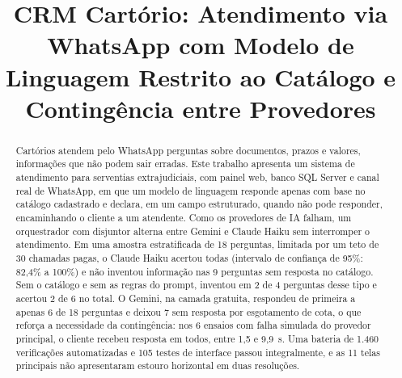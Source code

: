 \documentclass[conference]{IEEEtran}
\begin{document}
\title{CRM Cartório: Atendimento via WhatsApp com Modelo de Linguagem Restrito ao Catálogo e Contingência entre Provedores}

\author{
\and
{}
\and
{}
}

\maketitle

\begin{abstract}
Cartórios atendem pelo WhatsApp perguntas sobre documentos, prazos e valores, informações que não podem sair erradas. Este trabalho apresenta um sistema de atendimento para serventias extrajudiciais, com painel web, banco SQL Server e canal real de WhatsApp, em que um modelo de linguagem responde apenas com base no catálogo cadastrado e declara, em um campo estruturado, quando não pode responder, encaminhando o cliente a um atendente. Como os provedores de IA falham, um orquestrador com disjuntor alterna entre Gemini e Claude Haiku sem interromper o atendimento. Em uma amostra estratificada de 18 perguntas, limitada por um teto de 30 chamadas pagas, o Claude Haiku acertou todas (intervalo de confiança de 95\%: 82,4\% a 100\%) e não inventou informação nas 9 perguntas sem resposta no catálogo. Sem o catálogo e sem as regras do prompt, inventou em 2 de 4 perguntas desse tipo e acertou 2 de 6 no total. O Gemini, na camada gratuita, respondeu de primeira a apenas 6 de 18 perguntas e deixou 7 sem resposta por esgotamento de cota, o que reforça a necessidade da contingência: nos 6 ensaios com falha simulada do provedor principal, o cliente recebeu resposta em todos, entre 1,5 e 9,9~s. Uma bateria de 1.460 verificações automatizadas e 105 testes de interface passou integralmente, e as 11 telas principais não apresentaram estouro horizontal em duas resoluções.
\end{abstract}
\end{document}
